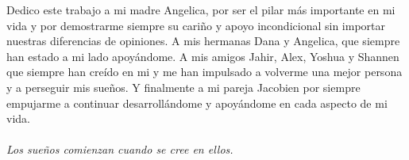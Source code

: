 
Dedico este trabajo a mi madre Angelica, por ser el pilar más importante en mi vida y por
demostrarme siempre su cariño y apoyo incondicional sin importar nuestras diferencias de opiniones.
A mis hermanas Dana y Angelica, que siempre han estado a mi lado apoyándome. A mis amigos Jahir,
Alex, Yoshua y Shannen que siempre han creído en mi y me han impulsado a volverme una mejor persona
y a perseguir mis sueños. Y finalmente a mi pareja Jacobien por siempre empujarme a continuar desarrollándome
y apoyándome en cada aspecto de mi vida.
\\
\\
\emph{Los sueños comienzan cuando se cree en ellos.}

